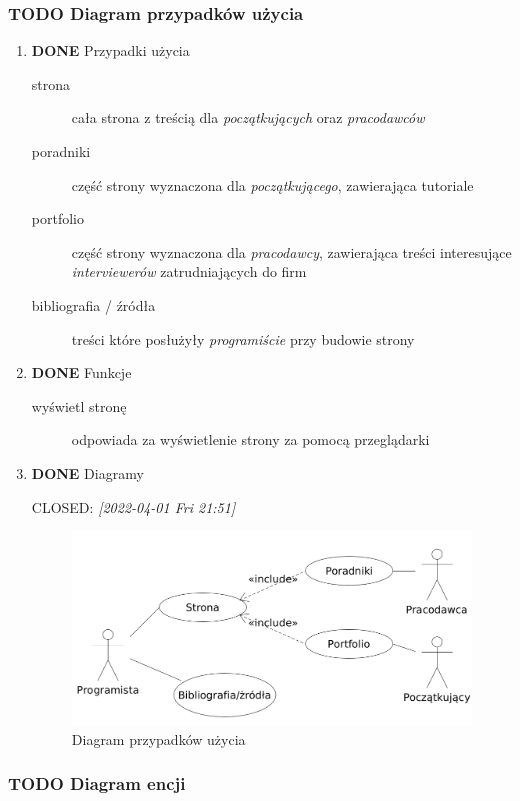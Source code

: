 \documentclass[11pt]{article}
\begin{document}
\subsubsection{{\bfseries\sffamily TODO} Diagram przypadków użycia}
\label{sec:org9cb336b}
\begin{enumerate}
\item {\bfseries\sffamily DONE} Przypadki użycia
\label{sec:orgaf42e03}
\begin{description}
\item[{strona}] cała strona z treścią dla \emph{początkujących} oraz \emph{pracodawców}
\item[{poradniki}] część strony wyznaczona dla \emph{początkującego}, zawierająca tutoriale
\item[{portfolio}] część strony wyznaczona dla \emph{pracodawcy}, zawierająca treści interesujące \emph{interviewerów} zatrudniających do firm
\item[{bibliografia / źródła}] treści które posłużyły \emph{programiście} przy budowie strony
\end{description}
\item {\bfseries\sffamily DONE} Funkcje
\label{sec:org0c9ce51}
\begin{description}
\item[{wyświetl stronę}] odpowiada za wyświetlenie strony za pomocą przeglądarki
\end{description}
\item {\bfseries\sffamily DONE} Diagramy
\label{sec:org6a3c625}

CLOSED: \textit{[2022-04-01 Fri 21:51]}
\begin{figure}[htbp]
\centering
\includegraphics[width=.9\linewidth]{./images/diagram_przypadkow_uzycia.png}
\caption{Diagram przypadków użycia}
\end{figure}
\end{enumerate}
\subsubsection{{\bfseries\sffamily TODO} Diagram encji}
\label{sec:orgafbef7a}
\end{document}
